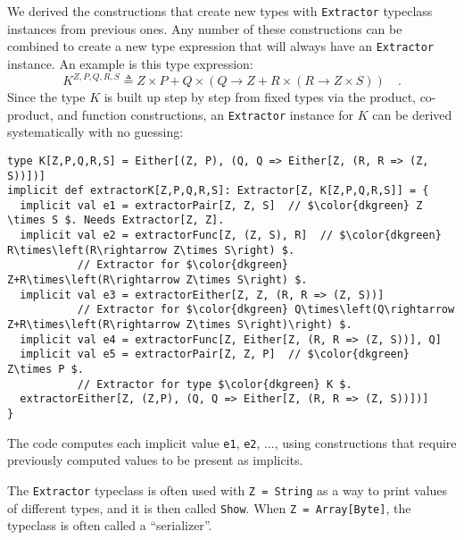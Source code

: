 We derived the constructions that create new types with \lstinline!Extractor!
typeclass instances from previous ones. Any number of these constructions
can be combined to create a new type expression that will always have
an \lstinline!Extractor! instance. An example is this type expression:
\[
K^{Z,P,Q,R,S}\triangleq Z\times P+Q\times\left(Q\rightarrow Z+R\times\left(R\rightarrow Z\times S\right)\right)\quad.
\]
Since the type $K$ is built up step by step from fixed types via
the product, co-product, and function constructions, an \lstinline!Extractor!
instance for $K$ can be derived systematically with no guessing:
\begin{lstlisting}[mathescape=true]
type K[Z,P,Q,R,S] = Either[(Z, P), (Q, Q => Either[Z, (R, R => (Z, S))])]
implicit def extractorK[Z,P,Q,R,S]: Extractor[Z, K[Z,P,Q,R,S]] = {
  implicit val e1 = extractorPair[Z, Z, S]  // $\color{dkgreen} Z \times S $. Needs Extractor[Z, Z].
  implicit val e2 = extractorFunc[Z, (Z, S), R]  // $\color{dkgreen} R\times\left(R\rightarrow Z\times S\right) $.
           // Extractor for $\color{dkgreen} Z+R\times\left(R\rightarrow Z\times S\right) $.
  implicit val e3 = extractorEither[Z, Z, (R, R => (Z, S))]
           // Extractor for $\color{dkgreen} Q\times\left(Q\rightarrow Z+R\times\left(R\rightarrow Z\times S\right)\right) $.
  implicit val e4 = extractorFunc[Z, Either[Z, (R, R => (Z, S))], Q]
  implicit val e5 = extractorPair[Z, Z, P]  // $\color{dkgreen} Z\times P $.
           // Extractor for type $\color{dkgreen} K $.
  extractorEither[Z, (Z,P), (Q, Q => Either[Z, (R, R => (Z, S))])]
}
\end{lstlisting}
The code computes each implicit value \lstinline!e1!, \lstinline!e2!,
..., using constructions that require previously computed values to
be present as implicits.

The \lstinline!Extractor! typeclass is often used with \lstinline!Z = String!
as a way to print values of different types, and it is then called
\lstinline!Show!. When \lstinline!Z = Array[Byte]!,
the typeclass is often called a \textsf{``}serializer\textsf{''}. 


